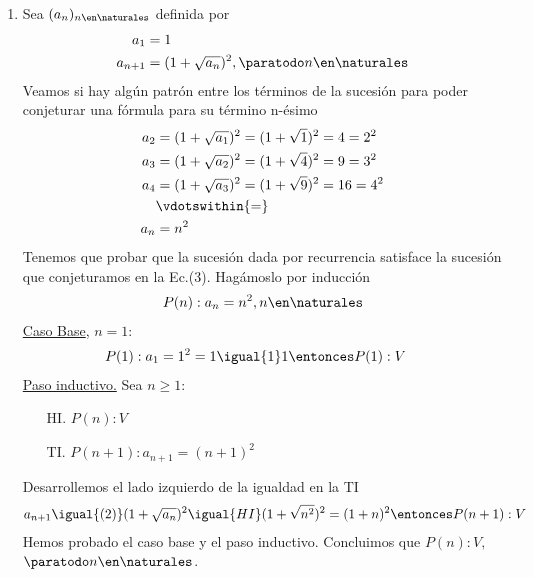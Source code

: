 \begin{enumerate}[label=\roman*)]
  \item Sea $(a_n)_{n \en \naturales }$ definida por
        \setcounter{equation}{0}
        \begin{align}
          a_1     & = 1                                              \\
          a_{n+1} & = (1 + \sqrt{a_n})^2, \paratodo n \en \naturales
        \end{align}
        Veamos si hay algún patrón entre los términos de la sucesión para poder conjeturar una fórmula para su término
        n-ésimo
        \begin{align}
          a_2 & = (1 +\sqrt{a_1})^2 = (1 + \sqrt{1})^2 = 4 = 2^2 \nonumber  \\
          a_3 & = (1 +\sqrt{a_2})^2 = (1 + \sqrt{4})^2 = 9 = 3^2 \nonumber  \\
          a_4 & = (1 +\sqrt{a_3})^2 = (1 + \sqrt{9})^2 = 16 = 4^2 \nonumber \\
              & \vdotswithin{=} \nonumber                                   \\
          a_n & = n^2
        \end{align}
        Tenemos que probar que la sucesión dada por recurrencia satisface la sucesión que conjeturamos en la Ec.(3).
        Hagámoslo por inducción
        \begin{align*}
          P(n): a_n = n^2,  n \en \naturales
        \end{align*}
        \underline{Caso Base}, $n = 1$:
        \begin{align*}
           & P(1): a_1 = 1^2 = 1 \igual{1} 1 \entonces P(1):V
        \end{align*}
        \underline{Paso inductivo.} Sea $n \geq 1$:
        \begin{enumerate}
          \item[HI.] $P(n): V$
          \item[TI.] $P(n+1): a_{n+1} = (n+1)^2$
        \end{enumerate}
        Desarrollemos el lado izquierdo de la igualdad en la TI
        \begin{align*}
          a_{n+1} \igual{(2)} (1 + \sqrt{a_n})^2 \igual{HI} (1 + \sqrt{n^2})^2 = (1 + n)^2
          \entonces P(n+1):V
        \end{align*}
        Hemos probado el caso base y el paso inductivo. Concluimos que $P(n):V,$ $\paratodo n \en \naturales $.


\end{enumerate}
